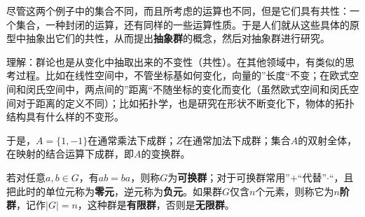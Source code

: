 \documentclass[12pt]{article}
\begin{document}
尽管这两个例子中的集合不同，而且所考虑的运算也不同，但是它们具有共性：一个集合，一种封闭的运算，还有同样的一些运算性质。于是人们就从这些具体的原型中抽象出它们的共性，从而提出\textbf{抽象群}的概念，然后对抽象群进行研究。

\begin{framed}
理解：群论也是从变化中抽取出来的不变性（共性）。在其他领域中，有类似的思考过程。比如在线性空间中，不管坐标基如何变化，向量的”长度“不变；在欧式空间和闵氏空间中，两点间的”距离“不随坐标的变化而变化（虽然欧式空间和闵氏空间对于距离的定义不同）；比如拓扑学，也是研究在形状不断变化下，物体的拓扑结构具有什么样的不变形。
\end{framed}


于是，$A = \{1, -1\}$在通常乘法下成群；$Z$在通常加法下成群；集合$A$的双射全体，在映射的结合运算下成群，即$A$的变换群。

若对任意$a,b \in G$，有$ab = ba$，则称$G$为\textbf{可换群}；对于可换群常用”$+$“代替”$\cdot$“，且把此时的单位元称为\textbf{零元}，逆元称为\textbf{负元}。如果群$G$仅含$n$个元素，则称它为\textbf{$n$阶群}，记作$|G| = n$，这种群是\textbf{有限群}，否则是\textbf{无限群}。
\end{document}
